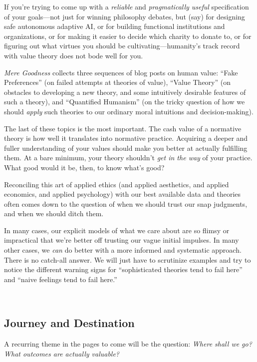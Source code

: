 {
 If you're trying to come up with a
\textit{reliable} and \textit{pragmatically useful} specification of
your goals---not just for winning philosophy debates, but (say) for
designing safe autonomous adaptive AI, or for building functional
institutions and organizations, or for making it easier to decide which
charity to donate to, or for figuring out what virtues you should be
cultivating---humanity's track record with value theory
does not bode well for you.}

{
 \textit{Mere Goodness} collects three sequences of blog posts on
human value: ``Fake Preferences''
(on failed attempts at theories of value), ``Value
Theory'' (on obstacles to developing a new theory,
and some intuitively desirable features of such a theory), and
``Quantified Humanism'' (on the
tricky question of how we should \textit{apply} such theories to our
ordinary moral intuitions and decision-making).}

{
 The last of these topics is the most important. The cash value of
a normative theory is how well it translates into normative practice.
Acquiring a deeper and fuller understanding of your values should make
you better at actually fulfilling them. At a bare minimum, your theory
shouldn't \textit{get in the way} of your practice.
What good would it be, then, to know what's good?}

{
 Reconciling this art of applied ethics (and applied aesthetics,
and applied economics, and applied psychology) with our best available
data and theories often comes down to the question of when we should
trust our snap judgments, and when we should ditch them.}

{
 In many cases, our explicit models of what we care about are so
flimsy or impractical that we're better off trusting
our vague initial impulses. In many other cases, we \textit{can} do
better with a more informed and systematic approach. There is no
catch-all answer. We will just have to scrutinize examples and try to
notice the different warning signs for ``sophisticated
theories tend to fail here'' and
``naive feelings tend to fail
here.''}

{
 ~}

\subsection{Journey and Destination}

{
 A recurring theme in the pages to come will be the question:
\textit{Where shall we go? What outcomes are actually valuable?}}

